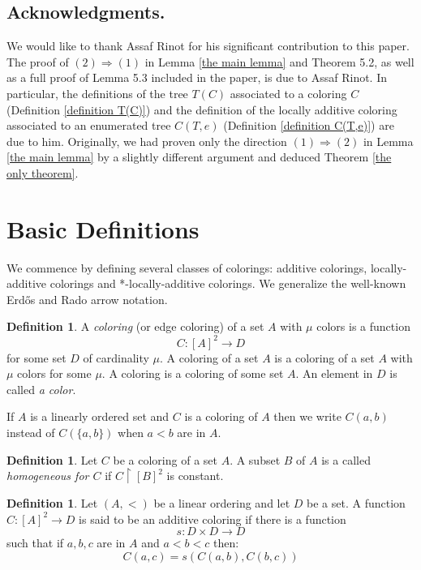 \documentclass[11pt]{amsart}
\theoremstyle{plain}
\theoremstyle{definition} %
\newtheorem{definition}[theorem]{Definition}
\theoremstyle{remark}
\begin{document}
\subsection*{Acknowledgments.}
We would like to thank Assaf Rinot for his significant contribution to this paper. The proof of $(2)\Rightarrow (1)$ in Lemma \ref{the main lemma} and  Theorem 5.2, as well as a full proof of Lemma 5.3 included in the paper, is due to Assaf Rinot. In particular, the definitions of the tree $ T(C)$ associated to a coloring $C$ (Definition \ref{definition T(C)}) and the definition of the locally additive coloring associated to an enumerated tree $C( T,e)$ (Definition \ref{definition C(T,e)}) are due to him.  Originally, we had proven only the direction $(1)\Rightarrow (2)$ in Lemma \ref{the main lemma} by a slightly different argument and deduced Theorem \ref{the only theorem}.

\section{Basic Definitions}
We commence by defining several classes of colorings: additive colorings, locally-additive colorings and *-locally-additive colorings. We generalize the well-known Erd\H{o}s and Rado arrow notation.

\begin{definition}
A \emph{coloring} (or edge coloring) of a set $A$ with $\mu$ colors is a function
\[
C:[A]^2 \to D
\]
for some set $D$ of cardinality $\mu$. A coloring of a set $A$ is a coloring of a set $A$ with $\mu$ colors for some $\mu$. A coloring is a coloring of some set $A$.  An element in $D$ is called \emph{a color}.

If $A$ is a linearly ordered set and $C$ is a coloring of $A$ then we write $C(a,b)$ instead of $C(\{a,b\})$ when $a<b$ are in $A$.
\end{definition}

\begin{definition}
Let $C$ be a coloring of a set $A$. A subset $B$ of $A$ is a called \emph{homogeneous for $C$} if $C \restriction [B]^2$ is constant.
\end{definition}

 \begin{definition}\label{definition additive}\cite[$\S$1]{sh42}
Let $(A,<)$ be a linear ordering and let $D$ be a set. A function $C:[A]^2\rightarrow D$
is said to be an additive coloring if there is a function
\[
s:D \times D \to D
\]
 such that if $a,b,c$ are in $A$ and
$a<b<c$ then:
\[
C(a,c)=s(C(a,b),C(b,c))
\]
\end{definition}
\end{document}
